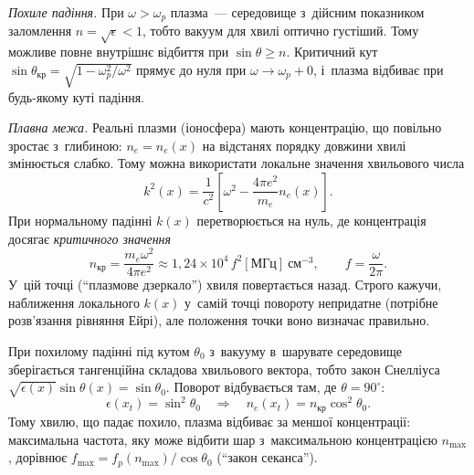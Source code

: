 \emph{Похиле падіння.} При $\omega>\omega_p$ плазма~--- середовище з~дійсним показником
заломлення $n=\sqrt\epsilon<1$, тобто вакуум для хвилі оптично густіший. Тому можливе
повне внутрішнє відбиття при $\sin\theta\geqslant n$. Критичний кут
$\sin\theta_{\mathrm{кр}}=\sqrt{1-\omega_p^2/\omega^2}$ прямує до нуля при
$\omega\to\omega_p+0$, і~плазма відбиває при будь-якому куті падіння.


\emph{Плавна межа.} Реальні плазми (іоносфера) мають концентрацію, що повільно зростає
з~глибиною: $n_e=n_e(x)$ на відстанях порядку довжини хвилі змінюється слабко. Тому можна
використати локальне значення хвильового числа
\begin{equation*}
	k^2(x)=\frac1{c^2}\left[\omega^2-\frac{4\pi e^2}{m_e}n_e(x)\right].
\end{equation*}
При нормальному падінні $k(x)$ перетворюється на нуль, де концентрація досягає
\emph{критичного значення}
\begin{equation}\label{eq:critical-density}
	n_{\mathrm{кр}}=\frac{m_e\omega^2}{4\pi e^2}\approx1{,}24\times10^{4}\,f^2[\mathrm{МГц}]~\mathrm{см}^{-3},\qquad f=\frac\omega{2\pi}.
\end{equation}
У~цій точці (\enquote{плазмове дзеркало}) хвиля повертається назад. Строго кажучи,
наближення локального $k(x)$ у~самій точці повороту непридатне (потрібне розв'язання
рівняння Ейрі), але положення точки воно визначає правильно.

При похилому падінні під кутом $\theta_0$ з~вакууму в~шарувате середовище зберігається
тангенційна складова хвильового вектора, тобто закон Снелліуса
$\sqrt{\epsilon(x)}\sin\theta(x)=\sin\theta_0$. Поворот відбувається там, де
$\theta=90^\circ$:
\begin{equation*}
	\epsilon(x_t)=\sin^2\theta_0\quad\Rightarrow\quad n_e(x_t)=n_{\mathrm{кр}}\cos^2\theta_0.
\end{equation*}
Тому хвилю, що падає похило, плазма відбиває за меншої концентрації: максимальна частота,
яку може відбити шар з~максимальною концентрацією $n_{\max}$, дорівнює
$f_{\max}=f_p(n_{\max})/\cos\theta_0$ (\enquote{закон секанса}).

